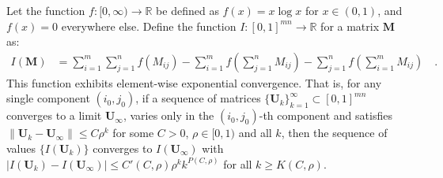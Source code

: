 \documentclass[../../main.tex]{subfiles}
\begin{document}
\begin{theorem}
Let the function $f: [0, \infty) \to \mathbb{R}$ be defined as $f(x) = x \log x$ for $x \in (0, 1)$, and $f(x) = 0$ everywhere else. Define the function $I: [0, 1]^{mn} \to \mathbb{R}$ for a matrix $\bm{M}$ as:
\begin{align*}
    I(\bm{M}) &= \sum_{i=1}^m \sum_{j=1}^n f(M_{ij}) - \sum_{i=1}^m f\left(\sum_{j=1}^n M_{ij}\right) - \sum_{j=1}^n f\left(\sum_{i=1}^m M_{ij}\right) \quad .
\end{align*}
This function exhibits element-wise exponential convergence. That is, for any single component $(i_0, j_0)$, if a sequence of matrices $\{\bm{U}_k\}_{k=1}^\infty \subset [0, 1]^{mn}$ converges to a limit $\bm{U}_\infty$, varies only in the $(i_0, j_0)$-th component and satisfies $\|\bm{U}_k - \bm{U}_\infty\| \leq C \rho^k$ for some $C > 0$, $\rho \in [0, 1)$ and all $k$, then the sequence of values $\{I(\bm{U}_k)\}$ converges to $I(\bm{U}_\infty)$ with $|I(\bm{U}_k) - I(\bm{U}_\infty)| \leq C'(C, \rho) \rho^k k^{P(C, \rho)}$ for all $k \geq K(C, \rho)$.
\end{theorem}
\pagebreak
\end{document}

